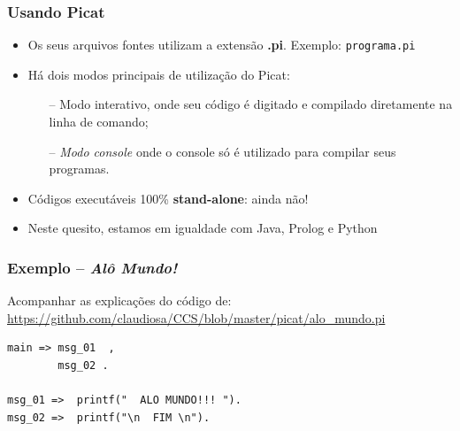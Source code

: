 \begin{frame}[fragile]
  \frametitle{Usando Picat}
  	\begin{itemize}
    
      
      
   
      \item Os seus arquivos fontes utilizam a extensão \textbf{.pi}. Exemplo: \texttt{programa.pi}
      \item Há dois modos principais de utilização do Picat: 
      
      \begin{itemize}
      	\item[--] Modo interativo, onde seu código é digitado e compilado diretamente na linha de 
        comando;
      	\item[--] \textit{Modo console} onde o console só é utilizado para compilar seus programas.
      \end{itemize}
      
      \pause
      \item Códigos executáveis 100\% \textbf{stand-alone}: ainda não!
      \item Neste quesito, estamos em igualdade com Java, Prolog e Python
     
    \end{itemize}
\end{frame}





\begin{frame}[fragile]
\frametitle{Exemplo -- \textit{Alô Mundo!}}

Acompanhar as explicações do código de:\\
\url{https://github.com/claudiosa/CCS/blob/master/picat/alo_mundo.pi}

\begin{verbatim}
main => msg_01  , 
        msg_02 .
        
msg_01 =>  printf("  ALO MUNDO!!! ").
msg_02 =>  printf("\n  FIM \n").
\end{verbatim}

\end{frame}


